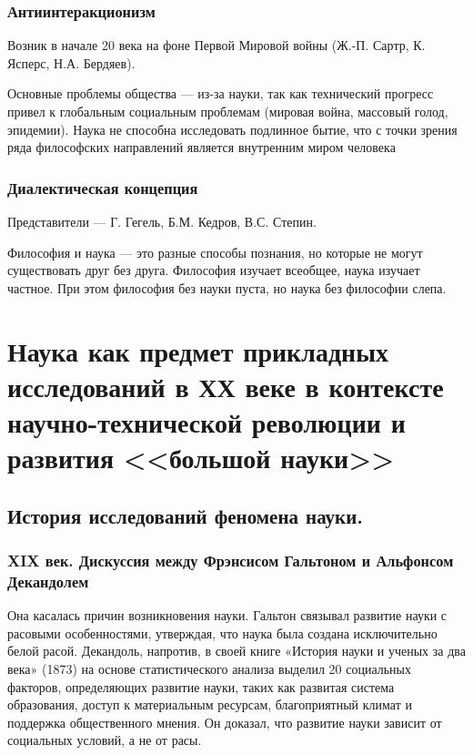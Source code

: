 \subsubsection{Антиинтеракционизм}

Возник в начале 20 века на фоне Первой Мировой войны (Ж.-П. Сартр, К. Ясперс, Н.А. Бердяев). 

Основные проблемы общества — из-за науки, так как технический прогресс привел к глобальным социальным проблемам (мировая война, массовый голод, эпидемии).
Наука не способна исследовать подлинное бытие, что с точки зрения ряда философских направлений является внутренним миром человека 

\subsubsection{Диалектическая концепция}

Представители — Г. Гегель, Б.М. Кедров, В.С. Степин.

Философия и наука — это разные способы познания, но которые не могут существовать друг без друга. Философия изучает всеобщее, наука изучает частное. При этом философия без науки пуста, но наука без философии слепа.


\section {Наука как предмет прикладных исследований в ХХ веке в контексте научно-технической революции и развития <<большой науки>>}

\subsection{История исследований феномена науки.}

\subsubsection{XIX век. Дискуссия между Фрэнсисом Гальтоном и Альфонсом Декандолем}

Она касалась причин возникновения науки. Гальтон связывал развитие науки с расовыми особенностями, утверждая, что наука была создана исключительно белой расой. Декандоль, напротив, в своей книге «История науки и ученых за два века» (1873) на основе статистического анализа выделил 20 социальных факторов, определяющих развитие науки, таких как развитая система образования, доступ к материальным ресурсам, благоприятный климат и поддержка общественного мнения. Он доказал, что развитие науки зависит от социальных условий, а не от расы.

